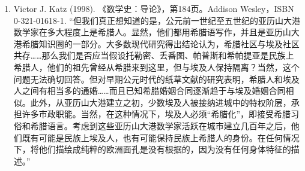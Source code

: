 \begin{enumerate}
\item Victor J. Katz (1998). 《数学史：导论》，第184页。Addison Wesley，ISBN 0-321-01618-1.  
“但我们真正想知道的是，公元前一世纪至五世纪的亚历山大港数学家在多大程度上是希腊人。显然，他们都用希腊语写作，并且是亚历山大港希腊知识圈的一部分。大多数现代研究得出结论认为，希腊社区与埃及社区共存……那么我们是否应当假设托勒密、丢番图、帕普斯和希帕提亚是民族上希腊人，他们的祖先曾经从希腊来到这里，但与埃及人保持隔离？当然，这个问题无法确切回答。但对早期公元时代的纸草文献的研究表明，希腊人和埃及人之间有相当多的通婚……而且已知希腊婚姻合同逐渐趋于与埃及婚姻合同相似。此外，从亚历山大港建立之初，少数埃及人被接纳进城中的特权阶层，承担许多市政职能。当然，在这种情况下，埃及人必须“希腊化”，即接受希腊习俗和希腊语言。考虑到这些亚历山大港数学家活跃在城市建立几百年之后，他们既有可能是民族上埃及人，也有可能保持民族上希腊人的身份。在任何情况下，将他们描绘成纯粹的欧洲面孔是没有根据的，因为没有任何身体特征的描述。”
\end{enumerate}